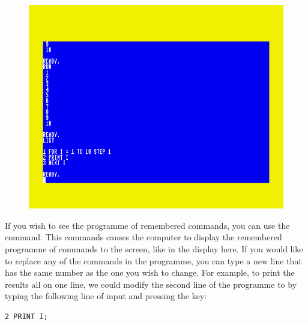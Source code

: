   \setlength{\intextsep}{0pt}%
  \begin{figure}
    \includegraphics[width=\linewidth]{images/first-steps-for-loop-programme-1-listing.png}
  \end{figure}

  If you wish to see the programme of remembered commands, you can use the 
  command.  This commands causes the computer to display the remembered programme of commands to the screen, like in the display here.
  If you would like to replace any of the commands in the programme, you can type a new line that has the same number as the one you wish to change. For example, to print the results all on one line, we could modify the second line of the programme to  by
  typing the following line of input and pressing the  key:

\begin{tcolorbox}[colback=black,coltext=white]
\verbatimfont{\codefont}
\begin{verbatim}
2 PRINT I;
\end{verbatim}
\end{tcolorbox}

